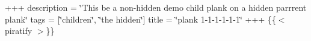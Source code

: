 +++ description = \char`\"{}\+This be a non-\/hidden demo child plank on a hidden parrrent plank\char`\"{} tags = \mbox{[}\char`\"{}children\char`\"{}, \char`\"{}the hidden\char`\"{}\mbox{]} title = \char`\"{}plank 1-\/1-\/1-\/1-\/1-\/1\char`\"{} +++ \{\{$<$ piratify $>$\}\} 
